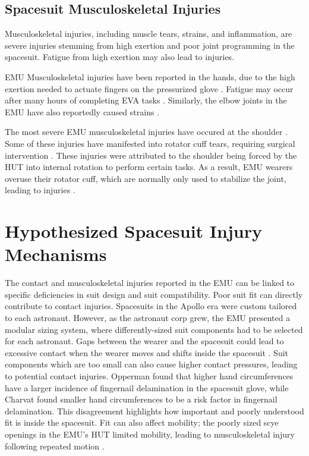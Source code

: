 \documentclass[defaultstyle,11pt]{comps}
\begin{document}
\hypertarget{spacesuit-musculoskeletal-injuries}{%
\subsection{Spacesuit Musculoskeletal Injuries}\label{spacesuit-musculoskeletal-injuries}}

Musculoskeletal injuries, including muscle tears, strains, and inflammation, are severe injuries stemming from high exertion and poor joint programming in the spacesuit. Fatigue from high exertion may also lead to injuries.

EMU Musculoskeletal injuries have been reported in the hands, due to the high exertion needed to actuate fingers on the pressurized glove \citep{Viegas2004}.
Fatigue may occur after many hours of completing EVA tasks \citep{Strauss2004, Scheuring2012}.
Similarly, the elbow joints in the EMU have also reportedly caused strains \citep{Strauss2004}.

The most severe EMU musculoskeletal injuries have occured at the shoulder \citep{Strauss2004}.
Some of these injuries have manifested into rotator cuff tears, requiring surgical intervention \citep{Strauss2005}.
These injuries were attributed to the shoulder being forced by the HUT into internal rotation to perform certain tasks.
As a result, EMU wearers overuse their rotator cuff, which are normally only used to stabilize the joint, leading to injuries \citep{Williams2003}.

\hypertarget{hypothesized-spacesuit-injury-mechanisms}{%
\section{Hypothesized Spacesuit Injury Mechanisms}\label{hypothesized-spacesuit-injury-mechanisms}}

The contact and musculoskeletal injuries reported in the EMU can be linked to specific deficiencies in suit design and suit compatibility.
Poor suit fit can directly contribute to contact injuries.
Spacesuits in the Apollo era were custom tailored to each astronaut.
However, as the astronaut corp grew, the EMU presented a modular sizing system, where differently-sized suit components had to be selected for each astronaut.
Gaps between the wearer and the spacesuit could lead to excessive contact when the wearer moves and shifts inside the spacesuit \citep{Benson2009}.
Suit components which are too small can also cause higher contact pressures, leading to potential contact injuries.
Opperman \citep{Opperman2010} found that higher hand circumferences have a larger incidence of fingernail delamination in the spacesuit glove, while Charvat \citep{Charvat2015} found smaller hand circumferences to be a risk factor in fingernail delamination.
This disagreement highlights how important and poorly understood fit is inside the spacesuit.
Fit can also affect mobility; the poorly sized scye openings in the EMU's HUT limited mobility, leading to musculoskeletal injury following repeated motion \citep{Williams2003}.
\end{document}

